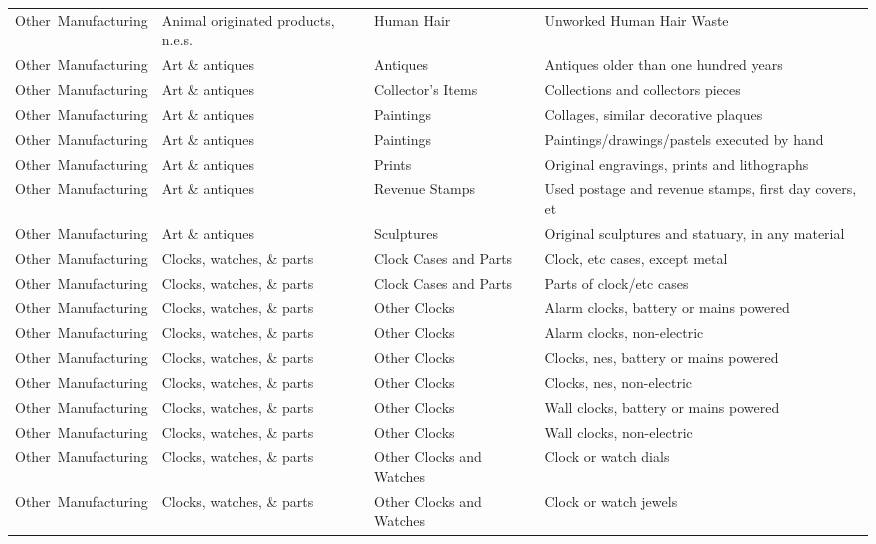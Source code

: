 \begin{appendices}
\begin{xltabular}{\textwidth}{|p{0.11\textwidth}|p{0.29\textwidth}|p{0.20\textwidth}|p{0.30\textwidth}|}
			\hline
			\endlastfoot
			Other\ Manufacturing & Animal originated products, n.e.s. & Human Hair & Unworked Human Hair Waste \\
			Other\ Manufacturing & Art \& antiques & Antiques & Antiques older than one hundred years \\
			Other\ Manufacturing & Art \& antiques & Collector's Items & Collections and collectors pieces \\
			Other\ Manufacturing & Art \& antiques & Paintings & Collages, similar decorative plaques \\
			Other\ Manufacturing & Art \& antiques & Paintings & Paintings/drawings/pastels executed by hand \\
			Other\ Manufacturing & Art \& antiques & Prints & Original engravings, prints and lithographs \\
			Other\ Manufacturing & Art \& antiques & Revenue Stamps & Used postage and revenue stamps, first day covers, et \\
			Other\ Manufacturing & Art \& antiques & Sculptures & Original sculptures and statuary, in any material \\
			Other\ Manufacturing & Clocks, watches, \& parts & Clock Cases and Parts & Clock, etc cases, except metal \\
			Other\ Manufacturing & Clocks, watches, \& parts & Clock Cases and Parts & Parts of clock/etc cases \\
			Other\ Manufacturing & Clocks, watches, \& parts & Other Clocks & Alarm clocks, battery or mains powered \\
			Other\ Manufacturing & Clocks, watches, \& parts & Other Clocks & Alarm clocks, non-electric \\
			Other\ Manufacturing & Clocks, watches, \& parts & Other Clocks & Clocks, nes, battery or mains powered \\
			Other\ Manufacturing & Clocks, watches, \& parts & Other Clocks & Clocks, nes, non-electric \\
			Other\ Manufacturing & Clocks, watches, \& parts & Other Clocks & Wall clocks, battery or mains powered \\
			Other\ Manufacturing & Clocks, watches, \& parts & Other Clocks & Wall clocks, non-electric \\
			Other\ Manufacturing & Clocks, watches, \& parts & Other Clocks and Watches & Clock or watch dials \\
			Other\ Manufacturing & Clocks, watches, \& parts & Other Clocks and Watches & Clock or watch jewels \\

\end{xltabular}
\end{appendices}
